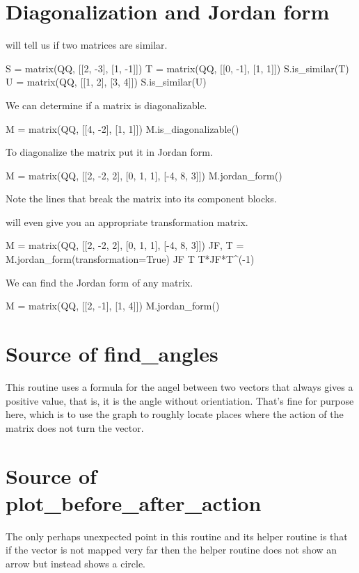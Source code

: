 \section{Diagonalization and Jordan form}

\Sage{} will tell us if two matrices are similar.
\begin{sageoutput}
S =  matrix(QQ, [[2, -3], [1, -1]]) 
T =  matrix(QQ, [[0, -1], [1,  1]]) 
S.is_similar(T)
U =  matrix(QQ, [[1, 2], [3,  4]]) 
S.is_similar(U)
\end{sageoutput}
\noindent

We can determine if a matrix is diagonalizable.
\begin{sageoutput}
M =  matrix(QQ, [[4, -2], [1, 1]])  
M.is_diagonalizable()
\end{sageoutput}
\noindent
To diagonalize the matrix put it in Jordan form.
\begin{sageoutput}
M =  matrix(QQ, [[2, -2, 2], [0, 1, 1], [-4, 8, 3]])  
M.jordan_form()
\end{sageoutput}
\noindent 
Note the \inlinecode{-+-+-} lines that break the matrix into its component
blocks.

\Sage{} will even give you an appropriate transformation matrix.
\begin{sageoutput}[d,0,1]
M =  matrix(QQ, [[2, -2, 2], [0, 1, 1], [-4, 8, 3]])  
JF, T = M.jordan_form(transformation=True)
JF
T
T*JF*T^(-1)
\end{sageoutput}

We can find the Jordan form of any matrix.
\begin{sageoutput}
M =  matrix(QQ, [[2, -1], [1, 4]])  
M.jordan_form()
\end{sageoutput}



\section{Source of find\_angles}
This routine uses a formula for the angel between two vectors that 
always gives a positive value, that is, it is the angle without orientiation.
That's fine for purpose here, which is to use the graph to 
roughly locate places where the action of the matrix does not turn the
vector. 



\section{Source of plot\_before\_after\_action}
The only perhaps unexpected point in this routine and its helper routine
is that if the vector is not mapped very far then the helper
routine does not show an arrow but instead shows a circle.



\endinput

TODO

1) Does python intro show 
   > x, y = 5, 7
construct?